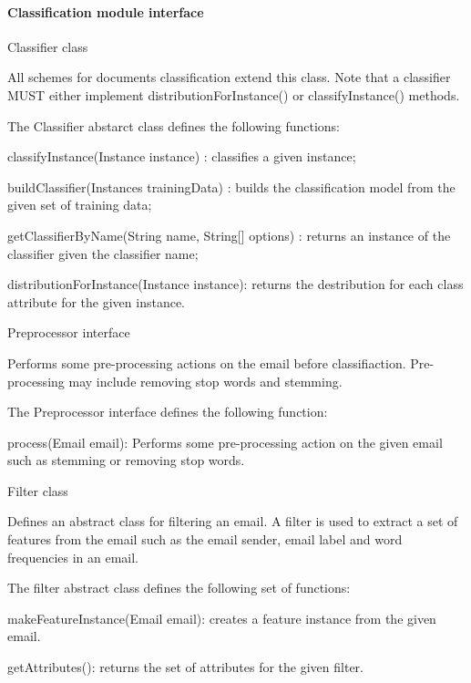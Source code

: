 \paragraph{Classification module interface}
\begin{my_itemize}
  \item Classifier class
  \begin{my_desc}
   \item[Purpose] All schemes for documents classification extend this class. Note that a classifier MUST either implement distributionForInstance() or classifyInstance() methods.
   \item[Function] The Classifier abstarct class defines the following functions:
	\begin{my_itemize}
		\item classifyInstance(Instance instance) : classifies a given instance;
		\item buildClassifier(Instances trainingData) : builds the classification model from the given set of training data;
		\item getClassifierByName(String name, String[] options) : returns an instance of the classifier given the classifier name;
		\item distributionForInstance(Instance instance): returns the destribution for each class attribute for the given instance.
	\end{my_itemize}
  \end{my_desc}

  \item Preprocessor interface
  \begin{my_desc}
   \item[Purpose] Performs some pre-processing actions on the email before classifiaction. Pre-processing may include removing stop words and stemming. 
   \item[Function] The Preprocessor interface defines the following function:
	\begin{my_itemize}
	\item process(Email email): Performs some pre-processing action on the given email such as stemming or removing stop words.
	\end{my_itemize}
  \end{my_desc}

  \item Filter class
  \begin{my_desc}
   \item[Purpose] Defines an abstract class for filtering an email. A filter is used to extract a set of features from the email such as the email sender, email label and word frequencies in an email.
   \item[Function] The filter abstract class defines the following set of functions:
	\begin{my_itemize}
	\item makeFeatureInstance(Email email): creates a feature instance from the given email.
	\item getAttributes(): returns the set of attributes for the given filter.
	\end{my_itemize}
  \end{my_desc}


\end{my_itemize}
